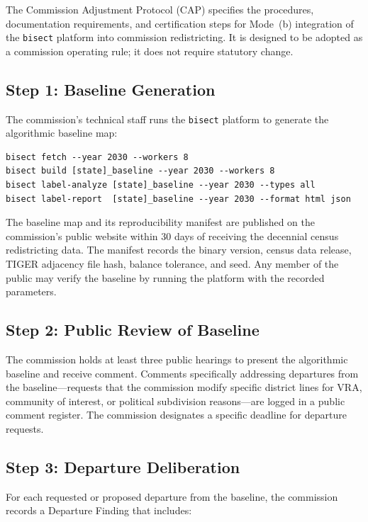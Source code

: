 The Commission Adjustment Protocol (CAP) specifies the procedures, documentation requirements, and certification steps for Mode~(b) integration of the \texttt{bisect} platform into commission redistricting. It is designed to be adopted as a commission operating rule; it does not require statutory change.

\subsection{Step 1: Baseline Generation}

The commission's technical staff runs the \texttt{bisect} platform to generate the algorithmic baseline map:
\begin{verbatim}
bisect fetch --year 2030 --workers 8
bisect build [state]_baseline --year 2030 --workers 8
bisect label-analyze [state]_baseline --year 2030 --types all
bisect label-report  [state]_baseline --year 2030 --format html json
\end{verbatim}

The baseline map and its reproducibility manifest are published on the commission's public website within 30 days of receiving the decennial census redistricting data. The manifest records the binary version, census data release, TIGER adjacency file hash, balance tolerance, and seed. Any member of the public may verify the baseline by running the platform with the recorded parameters.

\subsection{Step 2: Public Review of Baseline}

The commission holds at least three public hearings to present the algorithmic baseline and receive comment. Comments specifically addressing departures from the baseline---requests that the commission modify specific district lines for VRA, community of interest, or political subdivision reasons---are logged in a public comment register. The commission designates a specific deadline for departure requests.

\subsection{Step 3: Departure Deliberation}

For each requested or proposed departure from the baseline, the commission records a Departure Finding that includes:

